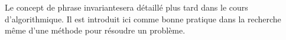 Le concept de \og phrase invariante\fg sera détaillé plus tard dans le cours d'algorithmique. Il est introduit ici comme bonne pratique dans la recherche même d'une méthode pour résoudre un problème.